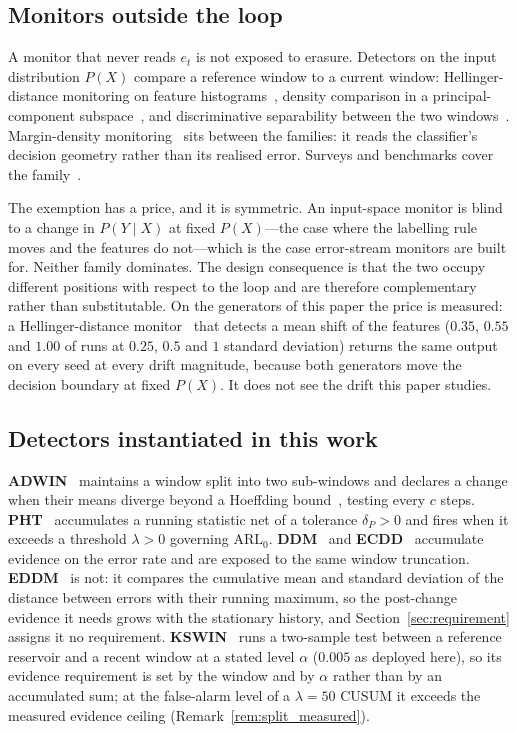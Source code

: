 \subsection{Monitors outside the loop}
A monitor that never reads $e_t$ is not exposed to erasure. Detectors on the
input distribution $P(X)$ compare a reference window to a current window:
Hellinger-distance monitoring on feature histograms~\cite{ditzler_hdddm_2011},
density comparison in a principal-component
subspace~\cite{qahtan_pcacd_2015}, and discriminative separability between the
two windows~\cite{gozuacik_d3_2019}. Margin-density
monitoring~\cite{sethi_md3_2017} sits between the families: it reads the
classifier's decision geometry rather than its realised error. Surveys and
benchmarks cover the family~\cite{gemaque_2020, hu_nofreelunch_2020,
lukats_2025}.

The exemption has a price, and it is symmetric. An input-space monitor is blind
to a change in $P(Y \mid X)$ at fixed $P(X)$---the case where the labelling rule
moves and the features do not---which is the case error-stream monitors are
built for. Neither family dominates. The design consequence is that the two
occupy different positions with respect to the loop and are therefore
complementary rather than substitutable. On the generators of this paper the
price is measured: a Hellinger-distance monitor~\cite{ditzler_hdddm_2011} that
detects a mean shift of the features ($0.35$, $0.55$ and $1.00$ of runs at
$0.25$, $0.5$ and $1$ standard deviation) returns the same output on every seed
at every drift magnitude, because both generators move the decision boundary at
fixed $P(X)$. It does not see the drift this paper studies.

\subsection{Detectors instantiated in this work}
\textbf{ADWIN}~\cite{bifet_adwin_2007} maintains a window split into two
sub-windows and declares a change when their means diverge beyond a Hoeffding
bound~\cite{hoeffding_1963}, testing every $c$ steps.
\textbf{PHT}~\cite{page_1954, basseville_1993} accumulates a running statistic
net of a tolerance $\delta_P>0$ and fires when it exceeds a threshold $\lambda>0$
governing $\mathrm{ARL}_0$. \textbf{DDM}~\cite{gama_ddm_2004} and \textbf{ECDD}~\cite{ross_ecdd_2012}
accumulate evidence on the error rate and are exposed to the same window
truncation. \textbf{EDDM}~\cite{baena_eddm_2006} is not: it compares the
cumulative mean and standard deviation of the distance between errors with their
running maximum, so the post-change evidence it needs grows with the stationary
history, and Section~\ref{sec:requirement} assigns it no requirement.
\textbf{KSWIN}~\cite{raab_kswin_2020} runs a two-sample test between a
reference reservoir and a recent window at a stated level $\alpha$ ($0.005$ as
deployed here), so its evidence requirement is set by the window and by
$\alpha$ rather than by an accumulated sum; at the false-alarm level of a
$\lambda = 50$ CUSUM it exceeds the measured evidence ceiling
(Remark~\ref{rem:split_measured}).